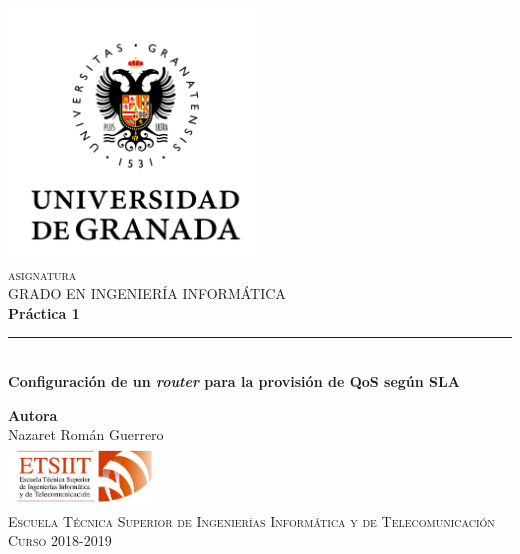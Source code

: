\documentclass[11pt,a4paper]{article}
\begin{document}
\begin{titlepage}

\begin{minipage}{\textwidth}

\centering
\includegraphics[width=0.5\textwidth]{img/logo.png}\\

\textsc{\Large asignatura\\[0.2cm]}
\textsc{GRADO EN INGENIERÍA INFORMÁTICA}\\[1cm]

{\Huge\bfseries Práctica 1\\}
\noindent\rule[-1ex]{\textwidth}{3pt}\\[3.5ex]
{\large\bfseries Configuración de un \textit{router} para la provisión de QoS según SLA}
\end{minipage}

\vspace{1.5cm}
\begin{minipage}{\textwidth}
\centering

\textbf{Autora}\\ {Nazaret Román Guerrero}\\[2.5ex]
\includegraphics[width=0.3\textwidth]{img/etsiit.jpeg}\\[0.1cm]
\vspace{1cm}
\textsc{Escuela Técnica Superior de Ingenierías Informática y de Telecomunicación}\\
\vspace{1cm}
\textsc{Curso 2018-2019}
\end{minipage}
\end{titlepage}

\tableofcontents
\thispagestyle{empty}
\end{document}

